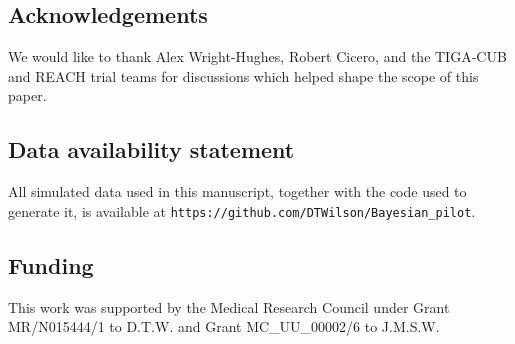 \documentclass[AMA,STIX1COL]{WileyNJD-v2}
\begin{document}
\subsection*{Acknowledgements}

We would like to thank Alex Wright-Hughes, Robert Cicero, and the TIGA-CUB and REACH trial teams for discussions which helped shape the scope of this paper.

\subsection*{Data availability statement}

All simulated data used in this manuscript, together with the code used to generate it, is available at \nolinkurl{https://github.com/DTWilson/Bayesian_pilot}.

\subsection*{Funding}

This work was supported by the Medical Research Council under Grant MR/N015444/1 to D.T.W. and Grant MC\_UU\_00002/6 to J.M.S.W.

%

\end{document}
